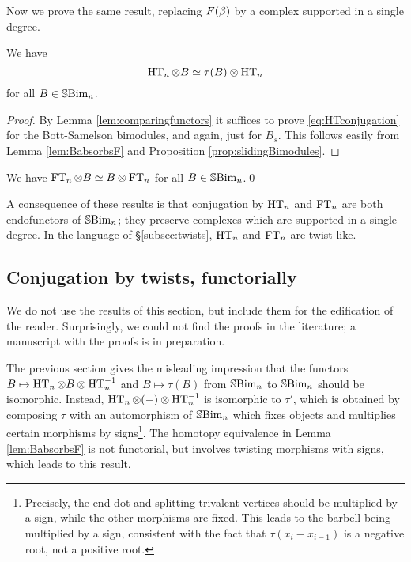 Now we prove the same result, replacing $F(\beta)$ by a complex supported in a single degree.

\begin{corollary}\label{cor:HTcommutes}
We have
\begin{equation}\label{eq:HTconjugation}
\operatorname{HT}_n\otimes B\simeq \tau(B)\otimes \operatorname{HT}_n
\end{equation}
for all $B\in {\mathbb{S}}{\rm Bim }_n$.
\end{corollary}

\begin{proof} By Lemma \ref{lem:comparingfunctors} it suffices to prove \eqref{eq:HTconjugation} for the Bott-Samelson bimodules, and again, just for $B_s$. This follows easily from
Lemma \ref{lem:BabsorbsF} and Proposition \ref{prop:slidingBimodules}. \end{proof}

\begin{corollary}\label{cor:FTcommutes}
We have $\operatorname{FT}_n\otimes B\simeq B\otimes \operatorname{FT}_n$ for all $B\in {\mathbb{S}}{\rm Bim }_n$.\qed
\end{corollary}

A consequence of these results is that conjugation by $\operatorname{HT}_n$ and $\operatorname{FT}_n$ are both endofunctors of ${\mathbb{S}}{\rm Bim }_n$; they preserve complexes which are supported in a single degree.  In the language of \S \ref{subsec:twists}, $\operatorname{HT}_n$ and $\operatorname{FT}_n$ are twist-like.

\subsection{Conjugation by twists, functorially}
\label{subsec:commutehalffulltrue}

We do not use the results of this section, but include them for the edification of the reader. Surprisingly, we could not find the proofs in the literature; a manuscript with the proofs
is in preparation.

The previous section gives the misleading impression that the functors $B\mapsto \operatorname{HT}_n \otimes B \otimes \operatorname{HT}_n^{-1}$ and $B\mapsto \tau(B)$ from ${\mathbb{S}}{\rm Bim }_n$ to ${\mathbb{S}}{\rm Bim }_n$ should be isomorphic.  Instead, $\operatorname{HT}_n \otimes (-) \otimes \operatorname{HT}_n^{-1}$ is isomorphic to $\tau'$, which is obtained by composing $\tau$ with an automorphism of ${\mathbb{S}}{\rm Bim }_n$ which fixes objects and multiplies certain morphisms by signs\footnote{Precisely, the end-dot and splitting trivalent vertices should be multiplied by a sign, while the other morphisms are fixed. This leads to the barbell being multiplied by a sign, consistent with the fact that $\tau(x_i - x_{i-1})$ is a negative root, not a positive root.}. The homotopy equivalence in Lemma \ref{lem:BabsorbsF} is not functorial,
but involves twisting morphisms with signs, which leads to this result.

